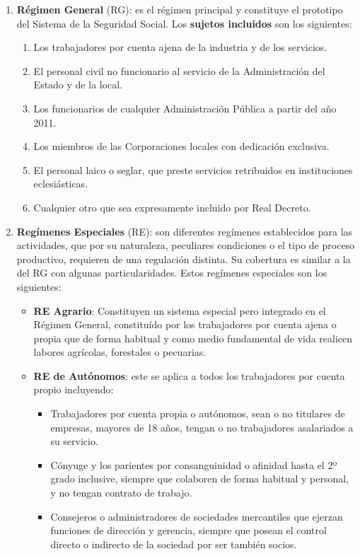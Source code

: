 \begin{enumerate}[label=(\alph*)]
    \item \textbf{Régimen General} (RG): es el régimen principal y constituye el prototipo del Sistema de la Seguridad Social. Los \textbf{sujetos incluidos} son los siguientes:

    \begin{enumerate}
        \item Los trabajadores por cuenta ajena de la industria y de los servicios.
        \item El personal civil no funcionario al servicio de la Administración del Estado y de la local.
        \item Los funcionarios de cualquier Administración Pública a partir del año 2011.
        \item Los miembros de las Corporaciones locales con dedicación exclusiva.
        \item El personal laico o seglar, que preste servicios retribuidos en instituciones eclesiásticas.
        \item Cualquier otro que sea expresamente incluido por Real Decreto.
    \end{enumerate}

    \item \textbf{Regímenes Especiales} (RE): son diferentes regímenes establecidos para las actividades, que por su naturaleza, peculiares condiciones o el tipo de proceso productivo, requieren de una regulación distinta. Su cobertura es similar a la del RG con algunas particularidades. Estos regímenes especiales son los siguientes:

    \begin{itemize}
        \item \textbf{RE Agrario}: Constituyen un sistema especial pero integrado en el Régimen General, constituído por los trabajadores por cuenta ajena o propia que de forma habitual y como medio fundamental de vida realicen labores agrícolas, forestales o pecuarias.

        \item \textbf{RE de Autónomos}: este se aplica a todos los trabajadores por cuenta propio incluyendo:

        \begin{itemize}
            \item Trabajadores por cuenta propia o autónomos, sean o no titulares de empresas, mayores de 18 años, tengan o no trabajadores asalariados a su servicio.
            \item Cónyuge y los parientes por consanguinidad o afinidad hasta el 2º grado inclusive, siempre que colaboren de forma habitual y personal, y no tengan contrato de trabajo.
            \item Consejeros o administradores de sociedades mercantiles que ejerzan funciones de dirección y gerencia, siempre que posean el control directo o indirecto de la sociedad por ser también socios.
        \end{itemize}


\end{itemize}
\end{enumerate}
